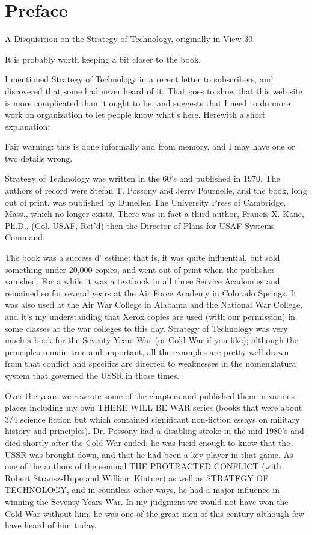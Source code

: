 \chapter*{Preface}

A Disquisition on the Strategy of Technology, originally in View 30.

It is probably worth keeping a bit closer to the book.

I mentioned Strategy of Technology in a recent letter to subscribers, and discovered that some had never heard of it. That goes to show that this web site is more complicated than it ought to be, and suggests that I need to do more work on organization to let people know what's here. Herewith a short explanation:

Fair warning: this is done informally and from memory, and I may have one or two details wrong.

Strategy of Technology was written in the 60's and published in 1970. The authors of record were Stefan T. Possony and Jerry Pournelle, and the book, long out of print, was published by Dunellen The University Press of Cambridge, Mass., which no longer exists. There was in fact a third author, Francis X. Kane, Ph.D., (Col. USAF, Ret'd) then the Director of Plans for USAF Systems Command.

The book was a success d' estime: that is, it was quite influential, but sold something under 20,000 copies, and went out of print when the publisher vanished. For a while it was a textbook in all three Service Academies and remained so for several years at the Air Force Academy in Colorado Springs. It was also used at the Air War College in Alabama and the National War College, and it's my understanding that Xerox copies are used (with our permission) in some classes at the war colleges to this day. Strategy of Technology was very much a book for the Seventy Years War (or Cold War if you like); although the principles remain true and important, all the examples are pretty well drawn from that conflict and specifics are directed to weaknesses in the nomenklatura system that governed the USSR in those times.

Over the years we rewrote some of the chapters and published them in various places including my own THERE WILL BE WAR series (books that were about 3/4 science fiction but which contained significant non-fiction essays on military history and principles). Dr. Possony had a disabling stroke in the mid-1980's and died shortly after the Cold War ended; he was lucid enough to know that the USSR was brought down, and that he had been a key player in that game. As one of the authors of the seminal THE PROTRACTED CONFLICT (with Robert Strausz-Hupe and William Kintner) as well as STRATEGY OF TECHNOLOGY, and in countless other ways, he had a major influence in winning the Seventy Years War. In my judgment we would not have won the Cold War without him; he was one of the great men of this century although few have heard of him today.

